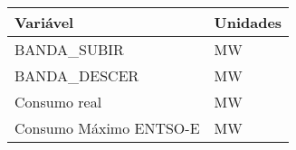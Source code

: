 \begin{tabular}{ll}
\toprule
Variável & Unidades \\
\midrule
BANDA_SUBIR & MW \\
BANDA_DESCER & MW \\
Consumo real & MW \\
Consumo Máximo ENTSO-E & MW \\
\bottomrule
\end{tabular}
